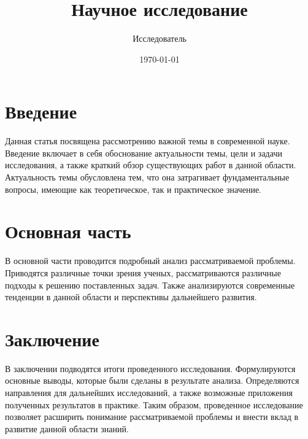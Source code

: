 \documentclass{article}
\title{Научное исследование}
\author{Исследователь}
\date{\today}
\begin{document}
\maketitle

\section{Введение}
Данная статья посвящена рассмотрению важной темы в современной науке. Введение включает в себя обоснование актуальности темы, цели и задачи исследования, а также краткий обзор существующих работ в данной области. Актуальность темы обусловлена тем, что она затрагивает фундаментальные вопросы, имеющие как теоретическое, так и практическое значение.

\section{Основная часть}
В основной части проводится подробный анализ рассматриваемой проблемы. Приводятся различные точки зрения ученых, рассматриваются различные подходы к решению поставленных задач. Также анализируются современные тенденции в данной области и перспективы дальнейшего развития.

\section{Заключение}
В заключении подводятся итоги проведенного исследования. Формулируются основные выводы, которые были сделаны в результате анализа. Определяются направления для дальнейших исследований, а также возможные приложения полученных результатов в практике. Таким образом, проведенное исследование позволяет расширить понимание рассматриваемой проблемы и внести вклад в развитие данной области знаний.



\end{document}
